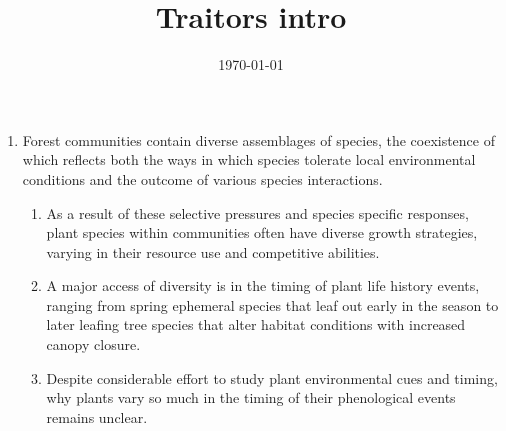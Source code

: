 \documentclass{article}
\begin{document}
\title{Traitors intro}
\date{\today}

\maketitle 

\begin{enumerate}

\item Forest communities contain diverse assemblages of species, the coexistence of which reflects both the ways in which species tolerate local environmental conditions and the outcome of various species interactions. 

\begin{enumerate}
\item As a result of these selective pressures and species specific responses, plant species within communities often have diverse growth strategies, varying in their resource use and competitive abilities. 
\item  A major access of diversity is in the timing of plant life history events, ranging from spring ephemeral species that leaf out early in the season to later leafing tree species that alter habitat conditions with increased canopy closure.
\item Despite considerable effort to study plant environmental cues and timing, why plants vary so much in the timing of their phenological events remains unclear.
\end{enumerate}


\end{enumerate}
\end{document}
